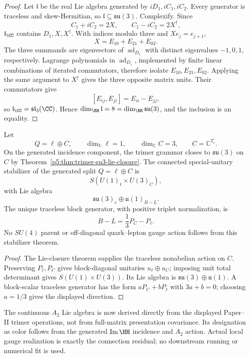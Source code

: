 \documentclass[12pt,a4paper]{article}
\begin{document}
\begin{proof}
Let \(\mathfrak l\) be the real Lie algebra generated by
\(iD_1,iC_1,iC_2\).  Every generator is traceless and skew-Hermitian, so
\(\mathfrak l\subseteq\mathfrak{su}(3)\).  Complexify.  Since
\[
C_1+iC_2=2X,\qquad C_1-iC_2=2X^\dagger,
\]
\(\mathfrak l_{\CC}\) contains \(D_1,X,X^\dagger\).  With indices modulo
three and \(Xe_j=e_{j+1}\),
\[
X=E_{10}+E_{21}+E_{02}.
\]
The three summands are eigenvectors of \(\operatorname{ad}_{D_1}\) with
distinct eigenvalues \(-1,0,1\), respectively.  Lagrange polynomials in
\(\operatorname{ad}_{D_1}\), implemented by finite linear combinations of
iterated commutators, therefore isolate \(E_{10},E_{21},E_{02}\).
Applying the same argument to \(X^\dagger\) gives the three opposite matrix
units.  Their commutators give
\[
[E_{ij},E_{ji}]=E_{ii}-E_{jj},
\]
so \(\mathfrak l_{\CC}=\mathfrak{sl}_3(\CC)\).  Hence
\(\dim_{\RR}\mathfrak l=8=\dim_{\RR}\mathfrak{su}(3)\), and the inclusion is
an equality.
\end{proof}

\begin{theorem}
\label{p5:thm:color-selection}
Let
\[
Q=\ell\oplus C,
\qquad \dim_{\mathbb C}\ell=1,
\qquad \dim_{\mathbb C}C=3,
\qquad C=\mathbb C^{T_c}.
\]
On the generated incidence component, the trimer grammar closes to
\(\mathfrak{su}(3)\) on \(C\) by
Theorem~\ref{p5:thm:trimer-su3-lie-closure}.  The connected special-unitary
stabilizer of the generated split \(Q=\ell\oplus C\) is
\[
S(U(1)_\ell\times U(3)_C),
\]
with Lie algebra
\[
\mathfrak{su}(3)_c\oplus\mathfrak u(1)_{B-L}.
\]
The unique traceless block generator, with positive triplet normalization, is
\[
B-L=\frac13P_C-P_\ell.
\]
No \(SU(4)\) parent or off-diagonal quark--lepton gauge action follows from
this stabilizer theorem.
\end{theorem}

\begin{proof}
The Lie-closure theorem supplies the traceless nonabelian action on \(C\).
Preserving \(P_\ell,P_C\) gives block-diagonal unitaries
\(u_\ell\oplus u_C\); imposing unit total determinant gives
\(S(U(1)\times U(3))\).  Its Lie algebra is
\(\mathfrak{su}(3)\oplus\mathfrak u(1)\).  A block-scalar traceless generator
has the form \(aP_C+bP_\ell\) with \(3a+b=0\); choosing \(a=1/3\) gives the
displayed direction.
\end{proof}

\begin{remark}
\label{p5:rem:color-forward-delta-crosslink}
The continuous \(A_2\) Lie algebra is now derived directly from the displayed
Paper--II trimer operations, not from full-matrix presentation covariance.
Its designation as color follows from the generated
\(\operatorname{Im}\HH\) incidence and \(A_2\) action.  Actual local gauge
realization is exactly the connection residual; no downstream running or
numerical fit is used.
\end{remark}
\end{document}

